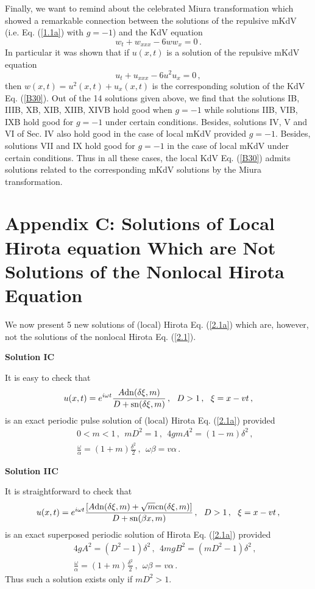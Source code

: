 \documentclass[11pt]{article}
\newcommand{\be}{\begin{equation}}
\newcommand{\ee}{\end{equation}}
\newcommand{\bea}{\begin{eqnarray}}
\newcommand{\eea}{\end{eqnarray}}
\newcommand{\sn}{{\rm sn}}
\newcommand{\dn}{{\rm dn}}
\newcommand{\cn}{{\rm cn}}
\begin{document}
Finally, we want to remind about the celebrated Miura transformation \cite{miura} which 
showed a remarkable connection between the solutions of the repulsive mKdV 
(i.e. Eq. (\ref{1.1a}) with $g = -1$) and the KdV equation
\be\label{B30}
w_t + w_{xxx} - 6 w w_{x} = 0\,.
\ee
In particular it was shown that if $u(x,t)$ is a solution of the repulsive
mKdV equation
\be\label{B31}
u_t + u_{xxx} - 6 u^2 u_{x} = 0\,,
\ee
then $w(x,t) = u^2(x,t)+u_x(x,t)$ is the corresponding solution of the 
KdV Eq. (\ref{B30}). Out of the 14 solutions given above, we find that the
solutions IB, IIIB, XB, XIB, XIIB, XIVB  hold good when $g = -1$ while 
solutions IIB, VIB, IXB hold good for $g = -1$ under certain conditions. 
Besides, solutions IV, V and VI of Sec. IV  also hold good in the case of local 
mKdV provided $g = -1$. Besides, solutions VII and IX hold good for $g = -1$ 
in the case of local mKdV under certain conditions. Thus in all these cases, 
the local KdV Eq. (\ref{B30}) admits solutions related to the corresponding
mKdV solutions by the Miura transformation. 

\section{Appendix C: Solutions of Local Hirota equation Which are Not Solutions of 
the Nonlocal Hirota Equation}

We now present 5 new solutions of (local) Hirota Eq. (\ref{2.1a}) which 
are, however, not the solutions of the nonlocal Hirota Eq. (\ref{2.1}).

{\bf Solution IC}

It is easy to check that 
\be\label{C1}
u(x,t) = e^{i\omega t} \frac{A\dn(\delta \xi,m)}{D+\sn(\delta \xi,m)}\,,
~~D > 1\,,~~\xi = x-vt\,,
\ee
is an exact periodic pulse solution of (local) Hirota Eq. (\ref{2.1a}) 
provided
\bea\label{C2}
&&0 < m < 1\,,~~ m D^2 = 1\,,~~4g m A^2 = (1-m) \delta^2\,,
\nonumber \\
&&\frac{\omega}{\alpha} = (1+m)\frac{\delta^2}{2}\,,
~~\omega \beta = v \alpha\,.
\eea

{\bf Solution IIC}

It is straightforward to check that 
\be\label{C3}
u(x,t) = e^{i\omega t} \frac{[A\dn(\delta \xi,m)+\sqrt{m}\cn(\delta \xi,m)]}
{D+\sn(\beta x,m)}\,,~~D > 1\,,~~\xi = x-vt\,,
\ee
is an exact superposed periodic solution of Hirota Eq. (\ref{2.1a}) provided
\bea\label{C4}
&&4g A^2 = (D^2-1)\delta^2\,,~~4 m g B^2 = (m D^2-1)\delta^2\,,
\nonumber \\
&&\frac{\omega}{\alpha} = (1+m)\frac{\delta^2}{2}\,,
~~\omega \beta = v \alpha\,.
\eea
Thus such a solution exists only if $m D^2 > 1$. 
\end{document}
